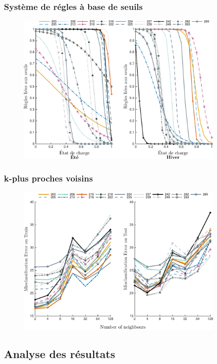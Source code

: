 \documentclass[french]{beamer}
\begin{document}
{\begin{frame}
\frametitle{Système de régles à base de seuils} 
\begin{figure}
\begin{center}
\includegraphics[width=0.9\textwidth]{figtbrFr.pdf}
\end{center}
\end{figure}
\end{frame}
% 


\begin{frame}
\frametitle{k-plus proches voisins} 
\begin{figure}
\begin{center}
\includegraphics[width=0.9\textwidth]{figknn.pdf}
\end{center}
\end{figure}
\end{frame}
% 
% 

\subsection{Analyse des résultats}
% 


}
\end{document}
